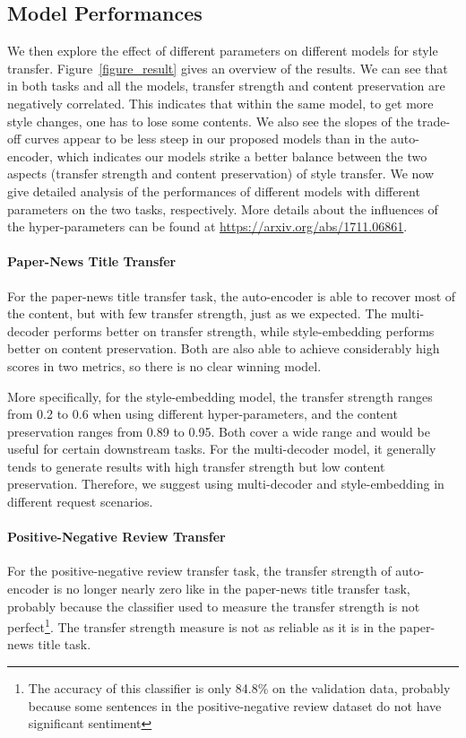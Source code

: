 \documentclass[letterpaper]{article} \usepackage{aaai18}  \usepackage{times}  \usepackage{helvet}  \usepackage{courier}  \usepackage{url}  \usepackage{graphicx}  \usepackage{amsmath}
\begin{document}
\subsection{Model Performances}
We then explore the effect of different parameters on different models for style transfer. 
Figure~\ref{figure_result} gives an overview of the results. 
We can see that in both tasks and all the models, transfer strength and content preservation are 
negatively correlated. This indicates that within the same model, to get more style changes, 
one has to lose some contents. We also see the slopes of the trade-off curves appear to be 
less steep in our proposed models than in the auto-encoder, which indicates our 
models strike a better balance between the two aspects (transfer strength and content preservation) of style transfer. 
We now give detailed analysis  of the performances of different models with different parameters on the two tasks, respectively. 
More details about the influences of the hyper-parameters can be found at \url{https://arxiv.org/abs/1711.06861}. 

\paragraph{Paper-News Title Transfer} For the paper-news title transfer task, the auto-encoder is able to recover most of the content,  
but with few transfer strength, just as we expected. 
The multi-decoder performs better on transfer strength, while style-embedding performs better on content preservation. 
Both are also able to achieve considerably high scores in two metrics, so there is no clear winning model.

More specifically, for the style-embedding model, the transfer strength ranges from 0.2 to 0.6 when using different hyper-parameters, 
and the content preservation ranges from 0.89 to 0.95.  Both cover a wide range and would be useful for certain downstream tasks.
For the multi-decoder model, it generally tends to generate results with high transfer strength but low content preservation. 
Therefore, we suggest using multi-decoder and style-embedding  in different request scenarios.

\paragraph{Positive-Negative Review Transfer}
For the positive-negative review transfer task, the transfer strength of auto-encoder is no longer nearly zero like in the paper-news title transfer task, 
probably because the classifier used to measure the transfer strength is not perfect\footnote{The accuracy of this classifier is only 84.8\% 
on the validation data, probably because some sentences in the positive-negative review dataset do not have significant sentiment}. 
The transfer strength measure is not as reliable as it is in the paper-news title task. 
\end{document}
